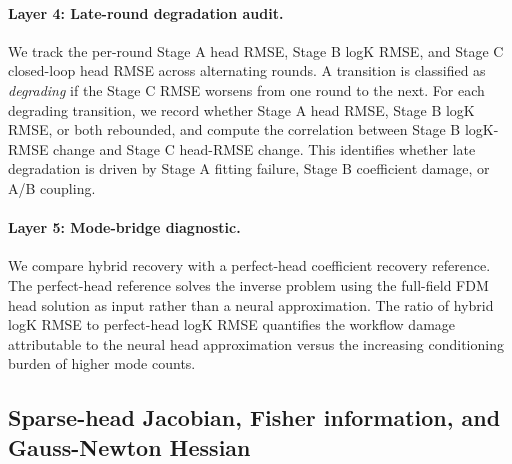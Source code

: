 \documentclass[pdflatex,sn-mathphys,Numbered,iicol]{sn-jnl}
\begin{document}
\paragraph{Layer 4: Late-round degradation audit.}
We track the per-round Stage A head RMSE, Stage B logK RMSE, and Stage C
closed-loop head RMSE across alternating rounds. A transition is classified as
\emph{degrading} if the Stage C RMSE worsens from one round to the next. For
each degrading transition, we record whether Stage A head RMSE, Stage B logK
RMSE, or both rebounded, and compute the correlation between Stage B
logK-RMSE change and Stage C head-RMSE change. This identifies whether late
degradation is driven by Stage A fitting failure, Stage B coefficient damage,
or A/B coupling.

\paragraph{Layer 5: Mode-bridge diagnostic.}
We compare hybrid recovery with a perfect-head coefficient recovery reference.
The perfect-head reference solves the inverse problem using the full-field FDM
head solution as input rather than a neural approximation. The ratio of hybrid
logK RMSE to perfect-head logK RMSE quantifies the workflow damage
attributable to the neural head approximation versus the increasing
conditioning burden of higher mode counts.

\subsection{Sparse-head Jacobian, Fisher information, and Gauss-Newton Hessian}
\label{sec:jacobian}
\end{document}

